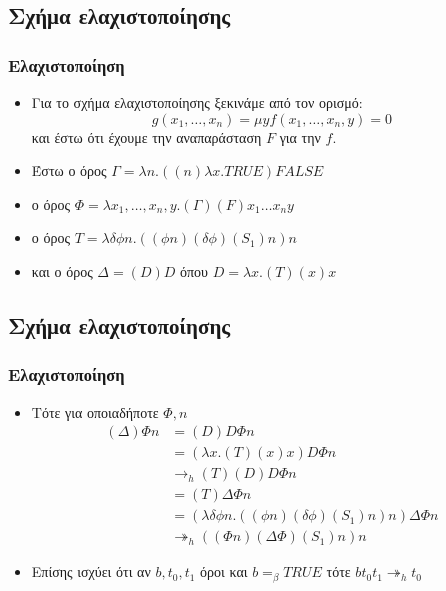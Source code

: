 \documentclass{beamer}
\begin{document}
\subsection{Σχήμα ελαχιστοποίησης}
\begin{frame}
        \frametitle{Ελαχιστοποίηση}
        \begin{itemize}
        	\item Για το σχήμα ελαχιστοποίησης ξεκινάμε από τον ορισμό:
        	$$g(x_1,\ldots,x_n) = \mu y {f(x_1,\ldots,x_n,y)=0}$$
        	και έστω ότι έχουμε την αναπαράσταση $F$ για την $f$.
        	\pause
        	\item Έστω ο όρος $\Gamma = \lambda n. ((n) \lambda x. TRUE) FALSE$
        	\pause
        	\item ο όρος $\Phi = \lambda x_1,\ldots,x_n,y . (\Gamma) (F) x_1 \ldots x_n y$
        	\pause
        	\item ο όρος $ T = \lambda \delta \phi n . ((\phi n)(\delta \phi) (S_1) n) n$
        	\pause
        	\item και ο όρος $\Delta = (D)D$ όπου $D = \lambda x . (T) (x) x$
        \end{itemize}
\end{frame}

\subsection{Σχήμα ελαχιστοποίησης}
\begin{frame}
        \frametitle{Ελαχιστοποίηση}
        \begin{itemize}
          \item Τότε για οποιαδήποτε $\Phi, n$
            $$ \begin{array}{ll}
            (\Delta) \Phi n &= (D) D \Phi n \\
                            &= (\lambda x. (T) (x) x) D \Phi n \\
                &\rightarrow_h (T) (D) D \Phi n \\
                            &= (T) \Delta \Phi n \\
                            &= (\lambda \delta \phi n . ((\phi n)(\delta \phi) (S_1) n) n) \Delta \Phi n \\
         &\twoheadrightarrow_h ((\Phi n) (\Delta \Phi) (S_1) n) n
            \end{array}$$
          \pause
          \item Επίσης ισχύει ότι αν $b, t_0, t_1$ όροι και $b =_\beta TRUE$ τότε $ b t_0 t_1 \twoheadrightarrow_h t_0$
        \end{itemize}
\end{frame}
\end{document}
